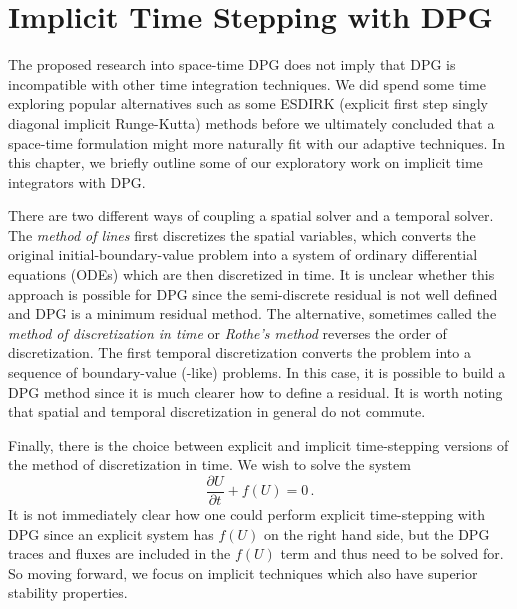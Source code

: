 \documentclass[Proposal.tex]{subfiles}
\begin{document}
\chapter{Implicit Time Stepping with DPG}
\label{sec:timestepping}
The proposed research into space-time DPG does not imply that DPG is incompatible with other time integration techniques. 
We did spend some time exploring popular alternatives such as some ESDIRK (explicit first step singly diagonal implicit Runge-Kutta) methods 
before we ultimately concluded that a space-time formulation might more naturally fit with our adaptive techniques.
In this chapter, we briefly outline some of our exploratory work on implicit time integrators with DPG.

There are two different ways of coupling a spatial solver and a temporal solver\cite{DemkowiczTransientAcoustics}.
The \emph{method of lines} first discretizes the spatial variables, which converts the original initial-boundary-value problem into a system
of ordinary differential equations (ODEs) which are then discretized in time. 
It is unclear whether this approach is possible for DPG since the semi-discrete residual is not well defined and DPG is a minimum residual method.
The alternative, sometimes called the \emph{method of discretization in time} or \emph{Rothe's method} reverses the order of discretization.
The first temporal discretization converts the problem into a sequence of boundary-value (-like) problems. 
In this case, it is possible to build a DPG method since it is much clearer how to define a residual.
It is worth noting that spatial and temporal discretization in general do not commute.


Finally, there is the choice between explicit and implicit time-stepping versions of the method of discretization in time.
We wish to solve the system
\[
\frac{\partial U}{\partial t}+f(U)=0\,.
\]
It is not immediately clear how one could perform explicit time-stepping with DPG since an explicit system has 
$f(U)$ on the right hand side, but the DPG traces and fluxes are included in the $f(U)$ term and thus need to be solved for.
So moving forward, we focus on implicit techniques which also have superior stability properties.
\end{document}
